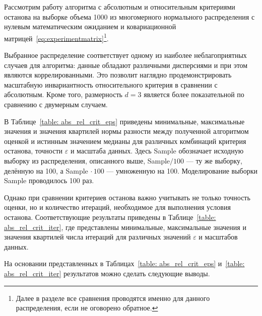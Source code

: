 Рассмотрим работу алгоритма с абсолютным и относительным критериями останова на выборке объема 1000 из многомерного нормального распределения с нулевым математическим ожиданием и ковариационной матрицей~\eqref{eq:experimentmatrix}\footnote{Далее в разделе все сравнения проводятся именно для данного распределения, если не оговорено обратное.}.

Выбранное распределение соответствует одному из наиболее неблагоприятных случаев для алгоритма: данные обладают различными дисперсиями и при этом являются коррелированными. Это позволит наглядно продемонстрировать масштабную инвариантность относительного критерия в сравнении с абсолютным. Кроме того, размерность $d=3$ является более показательной по сравнению с двумерным случаем.

В Таблице~\ref{table: abs_rel_crit_eps} приведены минимальные, максимальные значения и значения квартилей нормы разности между полученной алгоритмом оценкой и истинным значением медианы для различных комбинаций критерия останова, точности $\varepsilon$ и масштаба данных. Здесь Sample обозначает исходную выборку из распределения, описанного выше, Sample$/100$ --- ту же выборку, делённую на 100, а Sample$\,\cdot 100$ --- умноженную на 100. Моделирование выборки Sample проводилось 100 раз. 

Однако при сравнении критериев останова важно учитывать не только точность оценки, но и количество итераций, необходимое для выполнения условия останова. Соответствующие результаты приведены в Таблице~\ref{table: abs_rel_crit_iter}, где представлены минимальные, максимальные значения и значения квартилей числа итераций для различных значений $\varepsilon$ и масштабов данных.

На основании представленных в Таблицах~\ref{table: abs_rel_crit_eps} и~\ref{table: abs_rel_crit_iter} результатов можно сделать следующие выводы.

